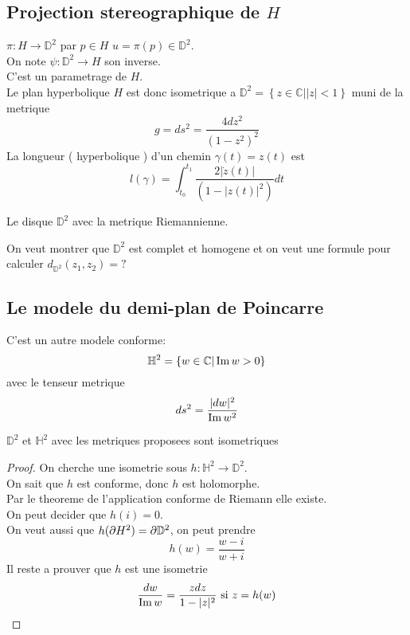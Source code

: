 \documentclass[../main.tex]{subfiles}
\begin{document}
\subsection{Projection stereographique de $H$ }
$\pi: H \to \mathbb{D}^{2}$ par $p\in H$ $u = \pi( p) \in \mathbb{D}^{2}$.\\
On note $\psi: \mathbb{D}^{2}\to H$ son inverse.\\
C'est un parametrage de $H$.\\
Le plan hyperbolique $H$ est donc isometrique a $ \mathbb{D}^{2}= \left\{ z \in \mathbb{C}| |z| < 1 \right\} $ muni de la metrique 
\[ 
g= ds^{2}= \frac{4 dz^{2}}{( 1- z^{2} )^{2}}
\]
La longueur ( hyperbolique )  d'un chemin $\gamma( t) = z( t) $ est 
\[ 
l( \gamma) = \int_{ t_0 }^{ t_1 } \frac{2| \dot z( t) |}{(  1- |z( t) |^{2} )}dt
\]
\begin{defn}
	Le disque $\mathbb{D}^{2}$ avec la metrique Riemannienne.
\end{defn}
On veut montrer que $ \mathbb{D}^{2}$ est complet et homogene et on veut une formule pour calculer $ d_{\mathbb{D}^{2}} ( z_1,z_2) = ?$ 
\subsection{Le modele du demi-plan de Poincarre}
C'est un autre modele conforme:
\[ 
\mathbb{H}^{2}= \left\{ w\in \mathbb{C}| \operatorname{Im} w>0 \right\} 
\]
avec le tenseur metrique 
\[ 
ds^{2}= \frac{|dw|^{2}}{\operatorname{Im} w ^{2}}
\]
\begin{propo}
$ \mathbb{D}^{2}$ et $ \mathbb{H}^{2}$ avec les metriques proposees sont isometriques 
\end{propo}
\begin{proof}
On cherche une isometrie sous $ h: \mathbb{H}^{2}\to \mathbb{D}^{2}$.\\
On sait que $h$ est conforme, donc $h$ est holomorphe.\\
Par le theoreme de l'application conforme de Riemann elle existe.\\
On peut decider que $h( i) =0$.\\
On veut aussi que $ h( \partial H^{2}) = \partial \mathbb{D}^{2}$, on peut prendre
\[ 
h( w) = \frac{w-i}{w+i}
\]
Il reste a prouver que $h$ est une isometrie
\[ 
\frac{dw}{\operatorname{Im} w }= \frac{z dz}{1- |z|^{2}} \text{ si }  z= h( w) 
\]

\end{proof}
\end{document}
